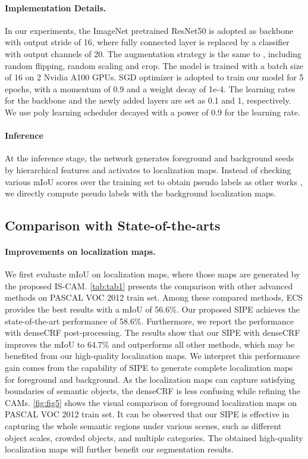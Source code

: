 \documentclass[10pt,twocolumn,letterpaper]{article}
\begin{document}
\paragraph{Implementation Details.}
In our experiments, the ImageNet \cite{deng2009imagenet} pretrained ResNet50 \cite{he2016deep} is adopted as backbone with output stride of 16, where fully connected layer is replaced by a classifier with output channels of 20.
The augmentation strategy is the same to \cite{lee2021anti}, including random flipping, random scaling and crop.
The model is trained with a batch size of 16 on 2 Nvidia A100 GPUs.
SGD optimizer is adopted to train our model for 5 epochs, with a momentum of 0.9 and a weight decay of 1e-4.
The learning rates for the backbone and the newly added layers are set as 0.1 and 1, respectively.
We use poly learning scheduler decayed with a power of 0.9 for the learning rate.

\paragraph{Inference}
At the inference stage, the network generates foreground and background seeds by hierarchical features and activates to localization maps.
Instead of checking various mIoU scores over the training set to obtain pseudo labels as other works \cite{wang2020self,lee2021anti}, we directly compute pseudo labels with the background localization maps.

\subsection{Comparison with State-of-the-arts}
\paragraph{Improvements on localization maps.}
We first evaluate mIoU on localization maps, where those maps are generated by the proposed IS-CAM.
\cref{tab:tab1} presents the comparison with other advanced methods on PASCAL VOC 2012 train set.
Among these compared methods, ECS \cite{sun2021ecs} provides the best results with a mIoU of 56.6\%.
Our proposed SIPE achieves the state-of-the-art performance of 58.6\%.
Furthermore, we report the performance with denseCRF post-processing.
The results show that our SIPE with denseCRF improves the mIoU to 64.7\% and outperforms all other methods, which may be benefited from our high-quality localization maps.
We interpret this performance gain comes from the capability of SIPE to generate complete localization maps for foreground and background.
As the localization maps can capture satisfying boundaries of semantic objects, the denseCRF is less confusing while refining the CAMs.
\cref{fig:fig5} shows the visual comparison of foreground localization maps on PASCAL VOC 2012 train set.
It can be observed that our SIPE is effective in capturing the whole semantic regions under various scenes, such as different object scales, crowded objects, and multiple categories.
The obtained high-quality localization maps will further benefit our segmentation results.
\end{document}
